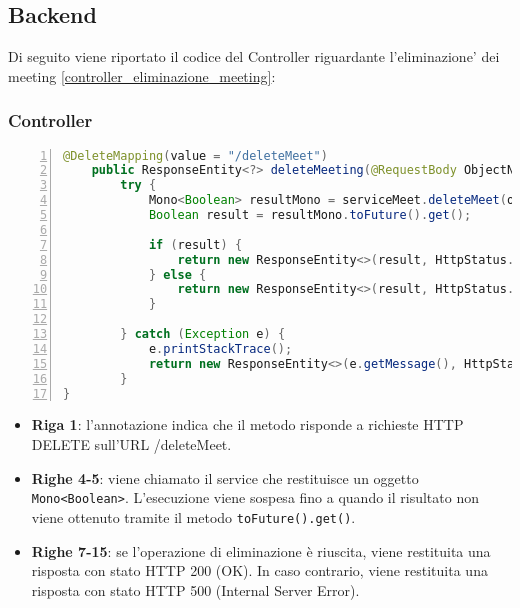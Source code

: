 \subsection{Backend}
Di seguito viene riportato il codice del Controller riguardante l'eliminazione' dei meeting \ref{controller_eliminazione_meeting}: 
\subsubsection{Controller}
\begin{lstlisting}[language=java, frame=lines, basicstyle=\ttfamily\scriptsize, numbers=left, 
    caption={controller eliminazione meeting}, label={controller_eliminazione_meeting}]
@DeleteMapping(value = "/deleteMeet")
    public ResponseEntity<?> deleteMeeting(@RequestBody ObjectNode obj) {
		try {
			Mono<Boolean> resultMono = serviceMeet.deleteMeet(obj);
			Boolean result = resultMono.toFuture().get();

			if (result) {
				return new ResponseEntity<>(result, HttpStatus.OK);
			} else {
				return new ResponseEntity<>(result, HttpStatus.INTERNAL_SERVER_ERROR);
			}

		} catch (Exception e) {
			e.printStackTrace();
			return new ResponseEntity<>(e.getMessage(), HttpStatus.INTERNAL_SERVER_ERROR);
		}
}
\end{lstlisting}
\begin{itemize}
    \item \textbf{Riga 1}: l’annotazione indica che il metodo risponde a richieste HTTP
    DELETE sull’URL /deleteMeet.

    \item \textbf{Righe 4-5}: viene chiamato il service che restituisce un oggetto \texttt{Mono<Boolean>}. 
    L'esecuzione viene sospesa fino a quando il risultato non viene ottenuto tramite il metodo \texttt{toFuture().get()}.

    \item \textbf{Righe 7-15}: se l'operazione di eliminazione è riuscita, viene restituita una risposta con stato HTTP 200 (OK). 
    In caso contrario, viene restituita una risposta con stato HTTP 500 (Internal Server Error).
\end{itemize}

